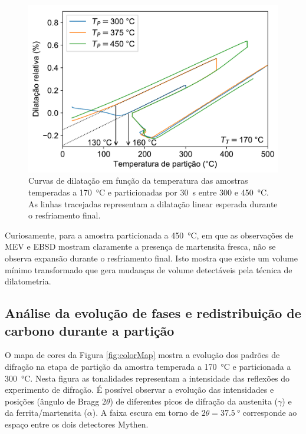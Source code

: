 \begin{figure}
  \includegraphics[width=.8\textwidth]{img/dilatometria/dlxT_qPT30s-fc.pdf}
  \caption{Curvas de dilatação em função da temperatura das amostras temperadas a \SI{170}{\degreeCelsius} e particionadas por 30~s entre 300 e \SI{450}{\degreeCelsius}. As linhas tracejadas representam a dilatação linear esperada durante o resfriamento final.}
  \label{fig:dilvsT_PT30s}
\end{figure}

Curiosamente, para a amostra particionada a \SI{450}{\degreeCelsius}, em que as observações de MEV e EBSD mostram claramente a presença de martensita fresca, não se observa expansão durante o resfriamento final. Isto mostra que existe um volume mínimo transformado que gera mudanças de volume detectáveis pela técnica de dilatometria.



\subsection{Análise  da evolução de fases e redistribuição de carbono durante a partição}

\label{sec:DRXInSitu}

O mapa de cores da Figura \ref{fig:colorMap} mostra a evolução dos padrões de difração na etapa de partição da amostra temperada a \SI{170}{\degreeCelsius} e particionada a \SI{300}{\degreeCelsius}. Nesta figura as tonalidades representam a intensidade das reflexões do experimento de difração. É possível observar a evolução das intensidades e posições (ângulo de Bragg $2\theta$) de diferentes picos de difração da austenita ($\gamma$) e da ferrita/martensita ($\alpha$). A faixa escura em torno de $2\theta = \SI{37.5}{\degree}$ corresponde ao espaço entre os dois detectores Mythen.

